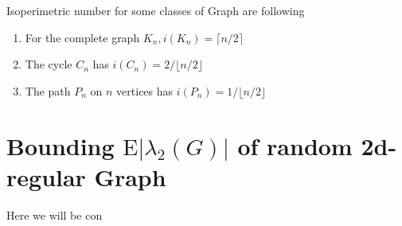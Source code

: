 \documentclass[oneside]{book}
\begin{document}
	
	
	
	Isoperimetric number for some classes of Graph are following \par
	\begin{enumerate}
		\item   For the complete graph $K_{n}, i\left(K_{n}\right)=\lceil n / 2\rceil$ \par
		\item The cycle $C_{n}$ has $i\left(C_{n}\right)=2 /\lfloor n / 2\rfloor$ \par
		\item  The path $P_{n}$ on $n$ vertices has $i\left(P_{n}\right)=1 /\lfloor n / 2\rfloor$
	\end{enumerate}
	\section{Bounding $\mathrm{E}\left|\lambda_{2}(G)\right|$ of random 2d-regular Graph}
	\label{s:6 }
	Here  we will be con
	
\end{document}
